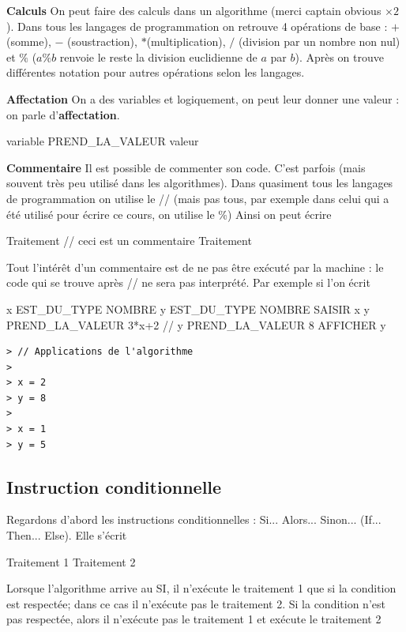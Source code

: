 \textbf{Calculs}\newline
On peut faire des calculs dans un algorithme (merci captain obvious $\times 2$). Dans tous les langages de programmation on retrouve 4 opérations de base : $+$ (somme), $-$ (soustraction), $*$(multiplication), $/$ (division par un nombre non nul) et $\%$ ($a\%b$ renvoie le reste la division euclidienne de $a$ par $b$). Après on trouve différentes notation pour autres opérations selon les langages.


\textbf{Affectation}\newline
On a des variables et logiquement, on peut leur donner une valeur : on parle d'\textbf{affectation}.\newline

\begin{algobox}
\DebutAlgo
\Ligne variable PREND\_LA\_VALEUR valeur
\FinAlgo
\end{algobox}

\textbf{Commentaire}\newline
Il est possible de commenter son code. C'est parfois (mais souvent très peu utilisé dans les algorithmes). Dans quasiment tous les langages de programmation on utilise le // (mais pas tous, par exemple dans celui qui a été utilisé pour écrire ce cours, on utilise le \%)\newline
Ainsi on peut écrire 
\begin{algobox}
\DebutAlgo
\Ligne Traitement
\Ligne // ceci est un commentaire
\Ligne Traitement
\FinAlgo
\end{algobox}
Tout l'intérêt d'un commentaire est de ne pas être exécuté par la machine : le code qui se trouve après // ne sera pas interprété. Par exemple si l'on écrit
\begin{algobox}
\Variables
\Ligne x EST\_DU\_TYPE NOMBRE
\Ligne y EST\_DU\_TYPE NOMBRE
\DebutAlgo
\Ligne SAISIR x
\Ligne y PREND\_LA\_VALEUR 3*x+2
\Ligne // y PREND\_LA\_VALEUR 8
\Ligne AFFICHER y
\FinAlgo
\end{algobox}
\begin{verbatim}
> // Applications de l'algorithme
>
> x = 2
> y = 8
>
> x = 1
> y = 5
\end{verbatim}
\subsection{Instruction conditionnelle}
Regardons d'abord les instructions conditionnelles : Si... Alors... Sinon... (If... Then... Else). Elle s'écrit 
\begin{algobox}
\DebutSi
\Ligne Traitement 1
\FinSi
\Sinon
\DebutSinon
\Ligne Traitement 2
\FinSinon
\end{algobox} 
Lorsque l'algorithme arrive au SI, il n'exécute le traitement 1 que si la condition est respectée; dans ce cas il n'exécute pas le traitement 2. Si la condition n'est pas respectée, alors il n'exécute pas le traitement 1 et exécute le traitement 2\newline

